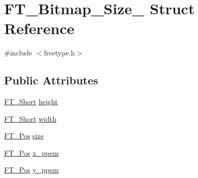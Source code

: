 \hypertarget{struct_f_t___bitmap___size__}{\section{F\-T\-\_\-\-Bitmap\-\_\-\-Size\-\_\- Struct Reference}
\label{struct_f_t___bitmap___size__}
}


{\ttfamily \#include $<$freetype.\-h$>$}

\subsection*{Public Attributes}
\begin{DoxyCompactItemize}
\item 
\hyperlink{fttypes_8h_aa7279be89046a2563cd3d4d6651fbdcf}{F\-T\-\_\-\-Short} \hyperlink{struct_f_t___bitmap___size___adf2f24039b458ff4674712886f242262}{height}
\item 
\hyperlink{fttypes_8h_aa7279be89046a2563cd3d4d6651fbdcf}{F\-T\-\_\-\-Short} \hyperlink{struct_f_t___bitmap___size___ab9da94223f75a89a649d1e6d018b17f1}{width}
\item 
\hyperlink{ftimage_8h_af5f230f4b253d4c7715fd2e595614c90}{F\-T\-\_\-\-Pos} \hyperlink{struct_f_t___bitmap___size___a1db23a6220fb6bcb712430821a6e5352}{size}
\item 
\hyperlink{ftimage_8h_af5f230f4b253d4c7715fd2e595614c90}{F\-T\-\_\-\-Pos} \hyperlink{struct_f_t___bitmap___size___a6f877a792d2dc93328037c928979215f}{x\-\_\-ppem}
\item 
\hyperlink{ftimage_8h_af5f230f4b253d4c7715fd2e595614c90}{F\-T\-\_\-\-Pos} \hyperlink{struct_f_t___bitmap___size___a60d4d003d09fd57505f69f39e31e19c1}{y\-\_\-ppem}
\end{DoxyCompactItemize}


